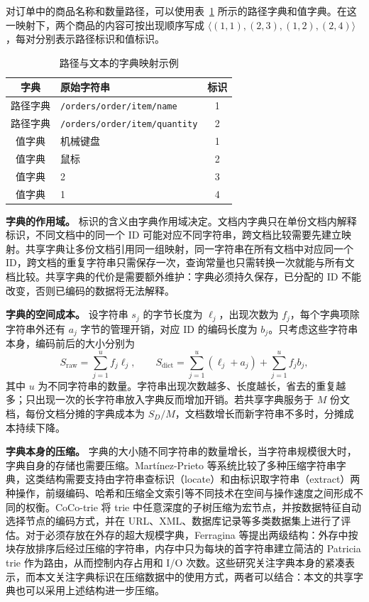 对订单中的商品名称和数量路径，可以使用表~\ref{tab:foundation-dictionary} 所示的路径字典和值字典。在这一映射下，两个商品的内容可按出现顺序写成 $\langle(1,1),(2,3),(1,2),(2,4)\rangle$，每对分别表示路径标识和值标识。

\begin{table}[htbp]
\centering
\caption{路径与文本的字典映射示例}
\label{tab:foundation-dictionary}
\begin{tabular}{clc}
\toprule
字典 & 原始字符串 & 标识 \\
\midrule
路径字典 & \texttt{/orders/order/item/name} & 1 \\
路径字典 & \texttt{/orders/order/item/quantity} & 2 \\
值字典 & 机械键盘 & 1 \\
值字典 & 鼠标 & 2 \\
值字典 & 2 & 3 \\
值字典 & 1 & 4 \\
\bottomrule
\end{tabular}
\end{table}

\textbf{字典的作用域。} 标识的含义由字典作用域决定。文档内字典只在单份文档内解释标识，不同文档中的同一个 ID 可能对应不同字符串，跨文档比较需要先建立映射。共享字典让多份文档引用同一组映射，同一字符串在所有文档中对应同一个 ID，跨文档的重复字符串只需保存一次，查询常量也只需转换一次就能与所有文档比较。共享字典的代价是需要额外维护：字典必须持久保存，已分配的 ID 不能改变，否则已编码的数据将无法解释。

\textbf{字典的空间成本。} 设字符串 $s_j$ 的字节长度为 $\ell_j$，出现次数为 $f_j$，每个字典项除字符串外还有 $a_j$ 字节的管理开销，对应 ID 的编码长度为 $b_j$。只考虑这些字符串本身，编码前后的大小分别为
\[
S_{\mathrm{raw}}=\sum_{j=1}^{u}f_j\ell_j,\qquad
S_{\mathrm{dict}}=\sum_{j=1}^{u}(\ell_j+a_j)+\sum_{j=1}^{u}f_jb_j,
\]
其中 $u$ 为不同字符串的数量。字符串出现次数越多、长度越长，省去的重复越多；只出现一次的长字符串放入字典反而增加开销。若共享字典服务于 $M$ 份文档，每份文档分摊的字典成本为 $S_D/M$，文档数增长而新字符串不多时，分摊成本持续下降。

\textbf{字典本身的压缩。} 字典的大小随不同字符串的数量增长，当字符串规模很大时，字典自身的存储也需要压缩。Martínez-Prieto 等系统比较了多种压缩字符串字典，这类结构需要支持由字符串查标识（locate）和由标识取字符串（extract）两种操作，前缀编码、哈希和压缩全文索引等不同技术在空间与操作速度之间形成不同的权衡\cite{martinezprieto2016practical}。CoCo-trie 将 trie 中任意深度的子树压缩为宏节点，并按数据特征自动选择节点的编码方式，并在 URL、XML、数据库记录等多类数据集上进行了评估\cite{boffa2024cocotrie}。对于必须存放在外存的超大规模字典，Ferragina 等提出两级结构：外存中按块存放排序后经过压缩的字符串，内存中只为每块的首字符串建立简洁的 Patricia trie 作为路由，从而控制内存占用和 I/O 次数\cite{ferragina2025twolevel}。这些研究关注字典本身的紧凑表示，而本文关注字典标识在压缩数据中的使用方式，两者可以结合：本文的共享字典也可以采用上述结构进一步压缩。

